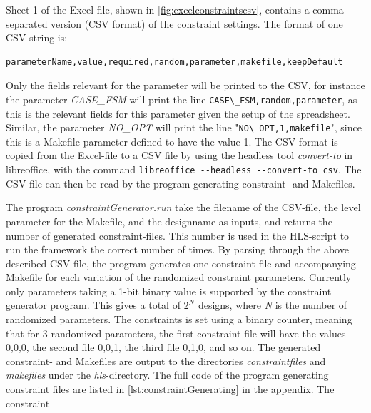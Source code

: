 Sheet 1 of the Excel file, shown in \cref{fig:excelconstraintscsv}, contains a comma-separated version (CSV format) of the constraint settings. The format of one CSV-string is:
\begin{verbatim}
parameterName,value,required,random,parameter,makefile,keepDefault
\end{verbatim}
Only the fields relevant for the parameter will be printed to the CSV, for instance the parameter \textit{CASE\_FSM} will print the line \verb!CASE\_FSM,random,parameter!, as this is the relevant fields for this parameter given the setup of the spreadsheet. Similar, the parameter \textit{NO\_OPT} will print the line "\verb!NO\_OPT,1,makefile!", since this is a Makefile-parameter defined to have the value 1.
The CSV format is copied from the Excel-file to a CSV file by using the headless tool \textit{convert-to} in libreoffice, with the command \verb!libreoffice --headless --convert-to csv!. The CSV-file can then be read by the program generating constraint- and Makefiles. 

The program \textit{constraintGenerator.run} take the filename of the CSV-file, the level parameter for the Makefile, and the designname as inputs, and returns the number of generated constraint-files. This number is used in the HLS-script to run the framework the correct number of times. By parsing through the above described CSV-file, the program generates one constraint-file and accompanying Makefile for each variation of the randomized constraint parameters. Currently only parameters taking a 1-bit binary value is supported by the constraint generator program. This gives a total of $2^N$ designs, where \textit{N} is the number of randomized parameters. The constraints is set using a binary counter, meaning that for 3 randomized parameters, the first constraint-file will have the values 0,0,0, the second file 0,0,1, the third file 0,1,0, and so on. The generated constraint- and Makefiles are output to the directories \textit{constraintfiles} and \textit{makefiles} under the \textit{hls}-directory. The full code of the program generating constraint files are listed in \cref{lst:constraintGenerating} in the appendix. The constraint

